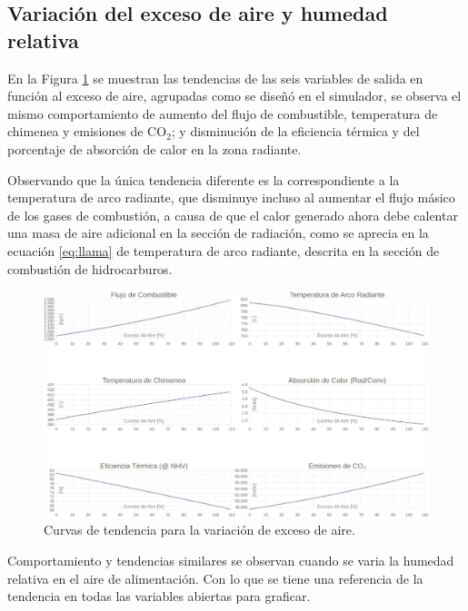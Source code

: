 \subsection{Variación del exceso de aire y humedad relativa}
\par En la Figura \ref{fig:exceso-aire} se muestran las tendencias de las seis variables de salida en función al exceso de aire, agrupadas como se diseñó en el simulador, se observa el mismo comportamiento de aumento del flujo de combustible, temperatura de chimenea y emisiones de CO$_2$; y disminución de la eficiencia térmica y del porcentaje de absorción de calor en la zona radiante.
\par Observando que la única tendencia diferente es la correspondiente a la temperatura de arco radiante, que disminuye incluso al aumentar el flujo másico de los gases de combustión, a causa de que el calor generado ahora debe calentar una masa de aire adicional en la sección de radiación, como se aprecia en la ecuación \ref{eq:llama} de temperatura de arco radiante, descrita en la sección de combustión de hidrocarburos.
\begin{figure}[H] \begin{center} \includegraphics[scale=0.249]{images/exceso-aire}
\caption[Curvas de tendencia para la variación de exceso de aire]
{Curvas de tendencia para la variación de exceso de aire.}
\label{fig:exceso-aire} \end{center} \end{figure}
\par Comportamiento y tendencias similares se observan cuando se varia la humedad relativa en el aire de alimentación. Con lo que se tiene una referencia de la tendencia en todas las variables abiertas para graficar.

